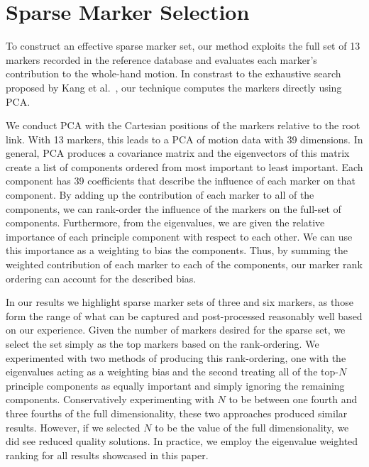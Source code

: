 
\section{Sparse Marker Selection}
To construct an effective sparse marker set, our method exploits the full set of 13 markers recorded in the reference database and evaluates each marker's contribution to the whole-hand motion. 
In constrast to the exhaustive search proposed by Kang et al.~, our technique computes the markers directly using PCA.

We conduct PCA with the Cartesian positions of the markers relative to the root link. With 13 markers, this leads to a PCA of motion data with 39 dimensions. In general, PCA produces a covariance matrix and the eigenvectors of this matrix create a list of components ordered from most important to least important.  
%
Each component has 39 coefficients that describe the influence of each marker on that component.  By adding up the contribution of each marker to all of the components, we can rank-order the influence of the markers on the full-set of components.  Furthermore, from the eigenvalues, we are given the relative importance of each principle component with respect to each other.  We can use this importance as a weighting to bias the components.  Thus, by summing the weighted contribution of each marker to each of the components, our marker rank ordering can account for the described bias.


In our results we highlight sparse marker sets of three and six markers, as those form the range of what can be captured and post-processed reasonably well based on our experience. 
Given the number of markers desired for the sparse set, we select the set simply as the top markers based on the rank-ordering.  We experimented with two methods of producing this rank-ordering, one with the eigenvalues acting as a weighting bias and the second treating all of the top-$N$ principle components as equally important and simply ignoring the remaining components. Conservatively experimenting with $N$ to be between one fourth and three fourths of the full dimensionality, these two approaches produced similar results.   However, if we selected $N$ to be the value of the full dimensionality, we did see reduced quality solutions.  In practice, we employ the eigenvalue weighted ranking for all results showcased in this paper.  

